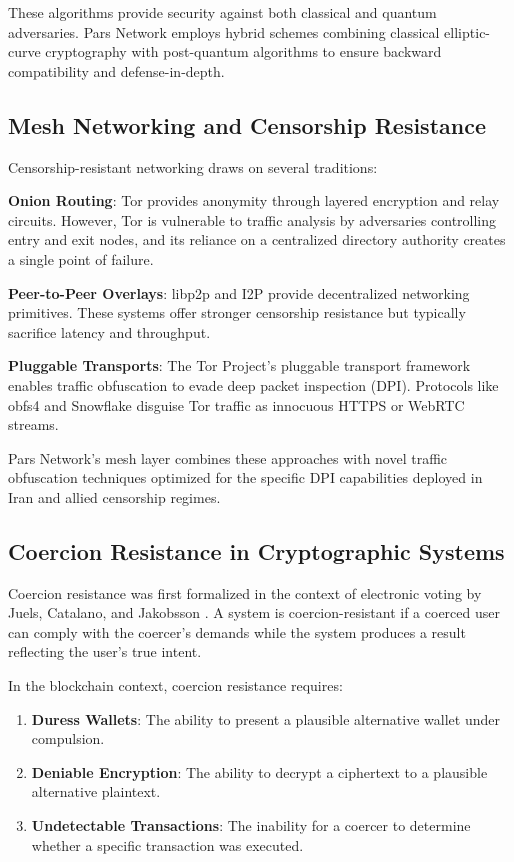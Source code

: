 \documentclass[11pt,a4paper,twocolumn]{article}
\begin{document}
These algorithms provide security against both classical and quantum adversaries. Pars Network employs hybrid schemes combining classical elliptic-curve cryptography with post-quantum algorithms to ensure backward compatibility and defense-in-depth.

\subsection{Mesh Networking and Censorship Resistance}

Censorship-resistant networking draws on several traditions:

\textbf{Onion Routing}: Tor \cite{dingledine2004tor} provides anonymity through layered encryption and relay circuits. However, Tor is vulnerable to traffic analysis by adversaries controlling entry and exit nodes, and its reliance on a centralized directory authority creates a single point of failure.

\textbf{Peer-to-Peer Overlays}: libp2p \cite{dias2022libp2p} and I2P \cite{zantout2011i2p} provide decentralized networking primitives. These systems offer stronger censorship resistance but typically sacrifice latency and throughput.

\textbf{Pluggable Transports}: The Tor Project's pluggable transport framework \cite{pt2012design} enables traffic obfuscation to evade deep packet inspection (DPI). Protocols like obfs4 \cite{angel2015obfs4} and Snowflake \cite{fifield2017snowflake} disguise Tor traffic as innocuous HTTPS or WebRTC streams.

Pars Network's mesh layer combines these approaches with novel traffic obfuscation techniques optimized for the specific DPI capabilities deployed in Iran and allied censorship regimes.

\subsection{Coercion Resistance in Cryptographic Systems}

Coercion resistance was first formalized in the context of electronic voting by Juels, Catalano, and Jakobsson \cite{juels2005coercion}. A system is coercion-resistant if a coerced user can comply with the coercer's demands while the system produces a result reflecting the user's true intent.

In the blockchain context, coercion resistance requires:
\begin{enumerate}
  \item \textbf{Duress Wallets}: The ability to present a plausible alternative wallet under compulsion.
  \item \textbf{Deniable Encryption}: The ability to decrypt a ciphertext to a plausible alternative plaintext.
  \item \textbf{Undetectable Transactions}: The inability for a coercer to determine whether a specific transaction was executed.
\end{enumerate}
\end{document}
